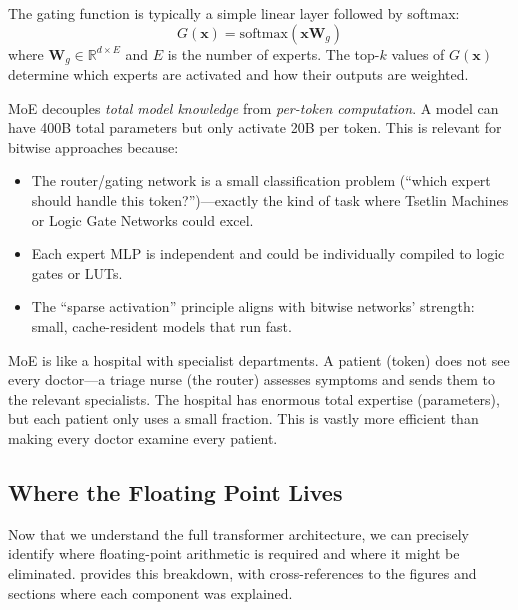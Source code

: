 The gating function is typically a simple linear layer followed by
softmax:
\begin{equation}
  G(\bm{x}) = \text{softmax}(\bm{x}\bm{W}_g)
  \label{eq:gating}
\end{equation}
where $\bm{W}_g \in \mathbb{R}^{d \times E}$ and $E$ is the number
of experts. The top-$k$ values of $G(\bm{x})$ determine which experts
are activated and how their outputs are weighted.

\begin{keyinsight}
MoE decouples \emph{total model knowledge} from \emph{per-token
computation}. A model can have 400B total parameters but only activate
20B per token. This is relevant for bitwise approaches because:
\begin{itemize}[leftmargin=1em]
  \item The router/gating network is a small classification problem
    (``which expert should handle this token?'')---exactly the kind
    of task where Tsetlin Machines or Logic Gate Networks could excel.
  \item Each expert MLP is independent and could be individually
    compiled to logic gates or LUTs.
  \item The ``sparse activation'' principle aligns with bitwise
    networks' strength: small, cache-resident models that run fast.
\end{itemize}
\end{keyinsight}

\begin{analogy}
MoE is like a hospital with specialist departments. A patient (token)
does not see every doctor---a triage nurse (the router) assesses
symptoms and sends them to the relevant specialists. The hospital has
enormous total expertise (parameters), but each patient only uses a
small fraction. This is vastly more efficient than making every doctor
examine every patient.
\end{analogy}

\subsection{Where the Floating Point Lives}
\label{sec:where-fp-lives}

Now that we understand the full transformer architecture, we can
precisely identify where floating-point arithmetic is required and
where it might be eliminated.  provides this
breakdown, with cross-references to the figures and sections where
each component was explained.

